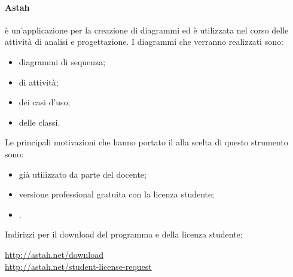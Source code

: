             \paragraph{Astah}
	         è un'applicazione per la creazione di diagrammi  ed è utilizzata nel corso delle attività di analisi e progettazione. I diagrammi che verranno realizzati sono:
	        \begin{itemize}
	        	\item diagrammi di sequenza;
	        	\item di attività;
	        	\item dei casi d'uso;
	        	\item delle classi.
	        \end{itemize}
            Le principali motivazioni che hanno portato il  alla scelta di questo strumento sono:
            \begin{itemize}
            	\item già utilizzato da parte del docente;
            	\item versione professional gratuita con la licenza studente;
            	\item {}.
            \end{itemize}
            Indirizzi per il download del programma e della licenza studente:
            \begin{center}
            	\url{http://astah.net/download} \\
            	\url{http://astah.net/student-license-request}
            \end{center}
